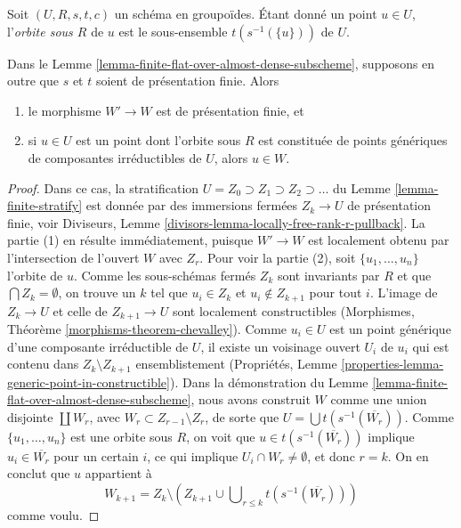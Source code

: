 \noindent
Soit $(U, R, s, t, c)$ un schéma en groupoïdes. Étant donné un point $u \in U$,
l'{\it orbite sous $R$} de $u$ est le sous-ensemble $t(s^{-1}(\{u\}))$ de $U$.

\begin{lemma}
\label{lemma-finite-flat-over-almost-dense-subscheme-addendum}
Dans le Lemme \ref{lemma-finite-flat-over-almost-dense-subscheme},
supposons en outre que $s$ et $t$ soient de présentation finie.
Alors
\begin{enumerate}
\item le morphisme $W' \to W$ est de présentation finie, et
\item si $u \in U$ est un point dont l'orbite sous $R$ est constituée de
points génériques de composantes irréductibles de $U$, alors $u \in W$.
\end{enumerate}
\end{lemma}

\begin{proof}
Dans ce cas, la stratification
$U = Z_0 \supset Z_1 \supset Z_2 \supset \ldots$ du
Lemme \ref{lemma-finite-stratify} est donnée par des immersions fermées $Z_k \to U$
de présentation finie, voir
Diviseurs, Lemme \ref{divisors-lemma-locally-free-rank-r-pullback}.
La partie (1) en résulte immédiatement, puisque $W' \to W$ est localement obtenu
par l'intersection de l'ouvert $W$ avec $Z_r$. Pour voir la partie (2),
soit $\{u_1, \ldots, u_n\}$ l'orbite de $u$.
Comme les sous-schémas fermés $Z_k$ sont invariants par $R$ et que
$\bigcap Z_k = \emptyset$, on trouve un $k$ tel que $u_i \in Z_k$
et $u_i \not \in Z_{k + 1}$ pour tout $i$.
L'image de $Z_k \to U$ et celle de $Z_{k + 1} \to U$ sont localement constructibles
(Morphismes, Théorème \ref{morphisms-theorem-chevalley}).
Comme $u_i \in U$ est un point générique d'une composante irréductible
de $U$, il existe un voisinage ouvert $U_i$ de $u_i$ qui
est contenu dans $Z_k \setminus Z_{k + 1}$ ensemblistement
(Propriétés, Lemme \ref{properties-lemma-generic-point-in-constructible}).
Dans la démonstration du Lemme \ref{lemma-finite-flat-over-almost-dense-subscheme},
nous avons construit $W$ comme une union disjointe $\coprod W_r$,
avec $W_r \subset Z_{r - 1} \setminus Z_r$, de sorte que
$U = \bigcup t(s^{-1}(\overline{W_r}))$. Comme $\{u_1, \ldots, u_n\}$
est une orbite sous $R$, on voit que $u \in t(s^{-1}(\overline{W_r}))$
implique $u_i \in \overline{W_r}$ pour un certain $i$, ce qui implique
$U_i \cap W_r \not = \emptyset$, et donc $r = k$.
On en conclut que $u$ appartient à
$$
W_{k + 1} = Z_k \setminus
\left(
Z_{k + 1} \cup \bigcup\nolimits_{r \leq k} t(s^{-1}(\overline{W_r}))
\right)
$$
comme voulu.
\end{proof}


